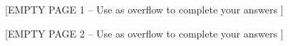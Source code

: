 \documentclass[addpoints, answers]{exam}
\begin{document}
\begin{questions}
	\question[10]
	\begin{solution}
          	\end{solution}

	\question
\fi %

	\newpage
	\begin{center}
		[EMPTY PAGE 1 -- Use as overflow to complete your
                answers ]
	\end{center}

	\newpage
	\begin{center}
		[EMPTY PAGE 2 -- Use as overflow to complete your
                answers ]
              \end{center}

\end{questions}
\end{document}

